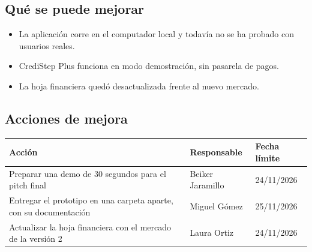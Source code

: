 \documentclass[11pt,a4paper]{article}
\begin{document}
\subsection{Qué se puede mejorar}
\begin{itemize}[leftmargin=1.5em]
  \item {La aplicación corre en el computador local y todavía no se ha probado con usuarios reales.}
  \item {CrediStep Plus funciona en modo demostración, sin pasarela de pagos.}
  \item {La hoja financiera quedó desactualizada frente al nuevo mercado.}
\end{itemize}

\subsection{Acciones de mejora}
\begin{tabularx}{\textwidth}{X l l}
  \toprule
  \textbf{Acción} & \textbf{Responsable} & \textbf{Fecha límite} \\
  \midrule
  Preparar una demo de 30 segundos para el pitch final & Beiker Jaramillo & 24/11/2026 \\
  Entregar el prototipo en una carpeta aparte, con su documentación & Miguel Gómez & 25/11/2026 \\
  Actualizar la hoja financiera con el mercado de la versión 2 & Laura Ortiz & 24/11/2026 \\
  \bottomrule
\end{tabularx}
\end{document}
